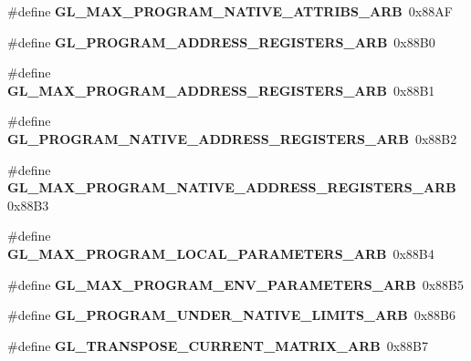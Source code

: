 \begin{DoxyCompactItemize}
\item 
\#define {\bfseries G\+L\+\_\+\+M\+A\+X\+\_\+\+P\+R\+O\+G\+R\+A\+M\+\_\+\+N\+A\+T\+I\+V\+E\+\_\+\+A\+T\+T\+R\+I\+B\+S\+\_\+\+A\+R\+B}~0x88\+A\+F\label{_s_d_l__opengl_8h_ab0a254a201c69c194966a6c42113a32f}

\item 
\#define {\bfseries G\+L\+\_\+\+P\+R\+O\+G\+R\+A\+M\+\_\+\+A\+D\+D\+R\+E\+S\+S\+\_\+\+R\+E\+G\+I\+S\+T\+E\+R\+S\+\_\+\+A\+R\+B}~0x88\+B0\label{_s_d_l__opengl_8h_a27d35362f5f6c5ac2acd04776326fa8a}

\item 
\#define {\bfseries G\+L\+\_\+\+M\+A\+X\+\_\+\+P\+R\+O\+G\+R\+A\+M\+\_\+\+A\+D\+D\+R\+E\+S\+S\+\_\+\+R\+E\+G\+I\+S\+T\+E\+R\+S\+\_\+\+A\+R\+B}~0x88\+B1\label{_s_d_l__opengl_8h_a839104d7c96607dc6b5c2aa9ba6fd4ef}

\item 
\#define {\bfseries G\+L\+\_\+\+P\+R\+O\+G\+R\+A\+M\+\_\+\+N\+A\+T\+I\+V\+E\+\_\+\+A\+D\+D\+R\+E\+S\+S\+\_\+\+R\+E\+G\+I\+S\+T\+E\+R\+S\+\_\+\+A\+R\+B}~0x88\+B2\label{_s_d_l__opengl_8h_a09156f5f0992a29addbf9eaeb8f746cf}

\item 
\#define {\bfseries G\+L\+\_\+\+M\+A\+X\+\_\+\+P\+R\+O\+G\+R\+A\+M\+\_\+\+N\+A\+T\+I\+V\+E\+\_\+\+A\+D\+D\+R\+E\+S\+S\+\_\+\+R\+E\+G\+I\+S\+T\+E\+R\+S\+\_\+\+A\+R\+B}~0x88\+B3\label{_s_d_l__opengl_8h_a5189a1315fb905f710d9aa0d44e73614}

\item 
\#define {\bfseries G\+L\+\_\+\+M\+A\+X\+\_\+\+P\+R\+O\+G\+R\+A\+M\+\_\+\+L\+O\+C\+A\+L\+\_\+\+P\+A\+R\+A\+M\+E\+T\+E\+R\+S\+\_\+\+A\+R\+B}~0x88\+B4\label{_s_d_l__opengl_8h_a61def4e10e64fdfb0d961529f2d29b1c}

\item 
\#define {\bfseries G\+L\+\_\+\+M\+A\+X\+\_\+\+P\+R\+O\+G\+R\+A\+M\+\_\+\+E\+N\+V\+\_\+\+P\+A\+R\+A\+M\+E\+T\+E\+R\+S\+\_\+\+A\+R\+B}~0x88\+B5\label{_s_d_l__opengl_8h_a554358da18b1964567c87d950de35c83}

\item 
\#define {\bfseries G\+L\+\_\+\+P\+R\+O\+G\+R\+A\+M\+\_\+\+U\+N\+D\+E\+R\+\_\+\+N\+A\+T\+I\+V\+E\+\_\+\+L\+I\+M\+I\+T\+S\+\_\+\+A\+R\+B}~0x88\+B6\label{_s_d_l__opengl_8h_adfb36766165a8a1742de7323e943d8f7}

\item 
\#define {\bfseries G\+L\+\_\+\+T\+R\+A\+N\+S\+P\+O\+S\+E\+\_\+\+C\+U\+R\+R\+E\+N\+T\+\_\+\+M\+A\+T\+R\+I\+X\+\_\+\+A\+R\+B}~0x88\+B7\label{_s_d_l__opengl_8h_a61621409aa3bdd74b143465ed45795db}


\end{DoxyCompactItemize}
